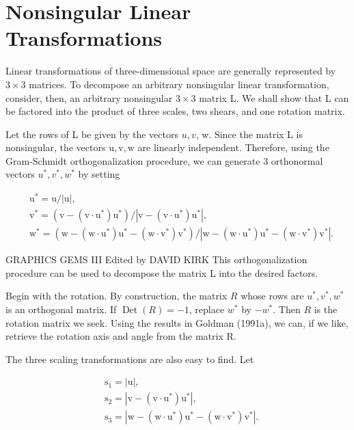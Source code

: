 \section{Nonsingular Linear Transformations}
Linear transformations of three-dimensional space are generally represented by $3 \times 3$ matrices. To decompose an arbitrary nonsingular linear transformation, consider, then, an arbitrary nonsingular $3 \times 3$ matrix L. We shall show that L can be factored into the product of three scales, two shears, and one rotation matrix.

Let the rows of L be given by the vectors $u, v$, w. Since the matrix L is nonsingular, the vectors $\mathrm{u}, \mathrm{v}, \mathrm{w}$ are linearly independent. Therefore, using the Gram-Schmidt orthogonalization procedure, we can generate 3 orthonormal vectors $u^{*}, v^{*}, w^{*}$ by setting

$$
\begin{aligned}
&\mathrm{u}^{*}=\mathrm{u} /|\mathrm{u}|, \\
&\mathrm{v}^{*}=\left(\mathrm{v}-\left(\mathrm{v} \cdot \mathrm{u}^{*}\right) \mathrm{u}^{*}\right) /\left|\mathrm{v}-\left(\mathrm{v} \cdot \mathrm{u}^{*}\right) \mathrm{u}^{*}\right|, \\
&\mathrm{w}^{*}=\left(\mathrm{w}-\left(\mathrm{w} \cdot \mathrm{u}^{*}\right) \mathrm{u}^{*}-\left(\mathrm{w} \cdot \mathrm{v}^{*}\right) \mathrm{v}^{*}\right) /\left|\mathrm{w}-\left(\mathrm{w} \cdot \mathrm{u}^{*}\right) \mathrm{u}^{*}-\left(\mathrm{w} \cdot \mathrm{v}^{*}\right) \mathrm{v}^{*}\right| .
\end{aligned}
$$

GRAPHICS GEMS III Edited by DAVID KIRK This orthogonalization procedure can be used to decompose the matrix L into the desired factors.

Begin with the rotation. By construction, the matrix $R$ whose rows are $u^{*}, v^{*}, w^{*}$ is an orthogonal matrix. If $\operatorname{Det}(R)=-1$, replace $w^{*}$ by $-w^{*}$. Then $R$ is the rotation matrix we seek. Using the results in Goldman (1991a), we can, if we like, retrieve the rotation axis and angle from the matrix R.

The three scaling transformations are also easy to find. Let

$$
\begin{aligned}
&\mathrm{s}_{1}=|\mathrm{u}|, \\
&\mathrm{s}_{2}=\left|\mathrm{v}-\left(\mathrm{v} \cdot \mathrm{u}^{*}\right) \mathrm{u}^{*}\right|, \\
&\mathrm{s}_{3}=\left|\mathrm{w}-\left(\mathrm{w} \cdot \mathrm{u}^{*}\right) \mathrm{u}^{*}-\left(\mathrm{w} \cdot \mathrm{v}^{*}\right) \mathrm{v}^{*}\right| .
\end{aligned}
$$

